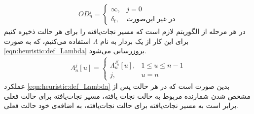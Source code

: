 \begin{align}\label{eqn:heuristic:def_ordinary_delay}
	OD_n^j = 
	\begin{cases}
		\infty, & \text{$j = 0$} \\
		\delta_t,& \text{در غیر این‌صورت}
	\end{cases}
\end{align}
در هر مرحله از الگوریتم لازم است که مسیر نجات‌یافته را برای هر حالت ذخیره کنیم برای این کار از یک بردار به نام $\Lambda$ استفاده می‌کنیم، که به صورت \cref{eqn:heuristic:def_Lambda} بروزرسانی می‌شود. 
\begin{align}\label{eqn:heuristic:def_Lambda}
	\Lambda_n^j[u] = 
	\begin{cases}
		\Lambda_n^{I_n^j}[u], & 1 \le u \le n-1 \\
		j, 				& u = n
	\end{cases}
\end{align}
عملکرد \cref{eqn:heuristic:def_Lambda} بدین صورت است که در هر حالت پس از مشخص شدن شمارنده مربوط به حالت نجات یافته، مسیر نجات‌یافته برای حالت فعلی برابر است به مسیر نجات‌یافته برای حالت نجات‌یافته، به اضافه‌ی خود حالت فعلی. 
